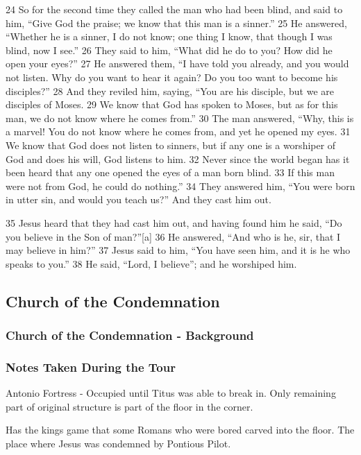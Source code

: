 \documentclass[letterpaper]{report}
\begin{document}
\begin{multicols}{2}
24 So for the second time they called the man who had been blind, and said to him, “Give God the praise; we know that this man is a sinner.” 25 He answered, “Whether he is a sinner, I do not know; one thing I know, that though I was blind, now I see.” 26 They said to him, “What did he do to you? How did he open your eyes?” 27 He answered them, “I have told you already, and you would not listen. Why do you want to hear it again? Do you too want to become his disciples?” 28 And they reviled him, saying, “You are his disciple, but we are disciples of Moses. 29 We know that God has spoken to Moses, but as for this man, we do not know where he comes from.” 30 The man answered, “Why, this is a marvel! You do not know where he comes from, and yet he opened my eyes. 31 We know that God does not listen to sinners, but if any one is a worshiper of God and does his will, God listens to him. 32 Never since the world began has it been heard that any one opened the eyes of a man born blind. 33 If this man were not from God, he could do nothing.” 34 They answered him, “You were born in utter sin, and would you teach us?” And they cast him out.

35 Jesus heard that they had cast him out, and having found him he said, “Do you believe in the Son of man?”[a] 36 He answered, “And who is he, sir, that I may believe in him?” 37 Jesus said to him, “You have seen him, and it is he who speaks to you.” 38 He said, “Lord, I believe”; and he worshiped him.
\end{multicols}

\clearpage
\subsection{Church of the Condemnation}
\begin{multicols}{2}
\subsubsection{Church of the Condemnation - Background}

\subsubsection{Notes Taken During the Tour}
Antonio Fortress - Occupied until Titus was able to break in. Only remaining part of original structure is part of the floor in the corner.

Has the kings game that some Romans who were bored carved into the floor.
The place where Jesus was condemned by Pontious Pilot.
\end{multicols}
\end{document}
